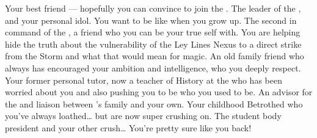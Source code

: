 \documentclass[char]{GL2020}
\begin{document}
\begin{contacts}
    \contact{\cAmbition{}} Your best friend — hopefully you can convince \cAmbition{\them} to join the \pGoaties{}.
    \contact{\cChupLeader{}} The leader of the \pGoaties{}, and your personal idol. You want to be like \cChupLeader{\them} when you grow up.
    \contact{\cChupSecond{}} The second in command of the \pGoaties{}, a friend who you can be your true self with. You are helping \cChupSecond{\them} hide the truth about the vulnerability of the Ley Lines Nexus to a direct strike from the Storm and what that would mean for magic.
    \contact{\cWildCard{}} An old family friend who always has encouraged your ambition and intelligence, who you deeply respect.
    \contact{\cHistory{}} Your former personal tutor, now a teacher of History at the \pSchool{} who has been worried about you and also pushing you to be who you used to be.
    \contact{\cDiplomat{}} An advisor for the \pTech{} and liaison between \cHeir{}'s family and your own.
    \contact{\cHeir{}} Your childhood Betrothed who you've always loathed\ldots{} but are now super crushing on.
    \contact{\cPresident{}} The student body president and your other crush\ldots{} You're pretty sure \cPresident{\they} like\cPresident{\verbs} you back!
\end{contacts}
\end{document}
